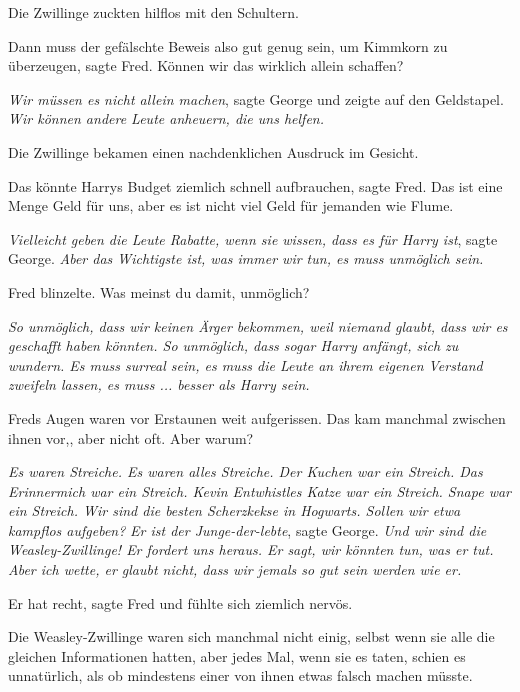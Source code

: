 Die Zwillinge zuckten hilflos mit den Schultern.

\glqq{}Dann muss der gefälschte Beweis also gut genug sein, um Kimmkorn zu
überzeugen\grqq{}, sagte Fred. \glqq{}Können wir das wirklich allein
schaffen?\grqq{}

\glqq{}\emph{Wir müssen es nicht allein machen}\grqq{}, sagte George und zeigte
auf den Geldstapel. \glqq{}\emph{Wir können andere Leute anheuern, die uns
helfen.}\grqq{}

Die Zwillinge bekamen einen nachdenklichen Ausdruck im Gesicht.

\glqq{}Das könnte Harrys Budget ziemlich schnell aufbrauchen\grqq{}, sagte Fred.
\glqq{}Das ist eine Menge Geld für uns, aber es ist nicht viel Geld für jemanden
wie Flume.\grqq{}

\glqq{}\emph{Vielleicht geben die Leute Rabatte, wenn sie wissen, dass es für
Harry ist}\grqq{}, sagte George. \glqq{}\emph{Aber das Wichtigste ist, was immer
wir tun, es muss unmöglich sein.}\grqq{}

Fred blinzelte. \glqq{}Was meinst du damit, unmöglich?\grqq{}

\glqq{}\emph{So unmöglich, dass wir keinen Ärger bekommen, weil niemand glaubt,
dass wir es geschafft haben könnten. So unmöglich, dass sogar Harry anfängt,
sich zu wundern. Es muss surreal sein, es muss die Leute an ihrem eigenen
Verstand zweifeln lassen, es muss ... besser als Harry sein.}\grqq{}

Freds Augen waren vor Erstaunen weit aufgerissen. Das kam manchmal zwischen
ihnen vor,, aber nicht oft. \glqq{}Aber warum?\grqq{}

\glqq{}\emph{Es waren Streiche. Es waren alles Streiche. Der Kuchen war ein
Streich. Das Erinnermich war ein Streich. Kevin Entwhistles Katze war ein
Streich. Snape war ein Streich. Wir sind die besten Scherzkekse in Hogwarts.
Sollen wir etwa kampflos aufgeben?}\grqq{} \glqq{}\emph{Er ist der
Junge-der-lebte}\grqq{}, sagte George. \glqq{}\emph{Und wir sind die
Weasley-Zwillinge! Er fordert uns heraus. Er sagt, wir könnten tun, was er tut.
Aber ich wette, er glaubt nicht, dass wir jemals so gut sein werden wie
er.}\grqq{}

\glqq{}Er hat recht\grqq{}, sagte Fred und fühlte sich ziemlich nervös.

Die Weasley-Zwillinge waren sich manchmal nicht einig, selbst wenn sie alle die
gleichen Informationen hatten, aber jedes Mal, wenn sie es taten, schien es
unnatürlich, als ob mindestens einer von ihnen etwas falsch machen müsste.

